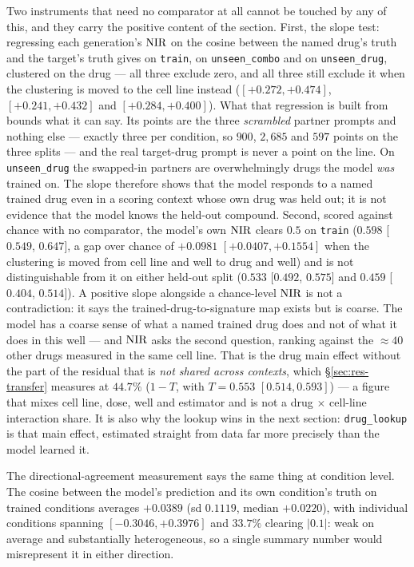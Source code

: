 Two instruments that need no comparator at all cannot be touched by any of this, and they carry the
positive content of the section. First, the slope test: regressing each generation's $\textrm{NIR}$ on the
cosine between the named drug's truth and the target's truth gives  on
\texttt{train},  on \texttt{unseen\_combo} and
 on \texttt{unseen\_drug}, clustered on the drug --- all three exclude
zero, and all three still exclude it when the clustering is moved to the cell line instead
($[+0.272, +0.474]$, $[+0.241, +0.432]$ and $[+0.284, +0.400]$). What that
regression is built from bounds what it can say. Its points are the three \emph{scrambled} partner
prompts and nothing else --- exactly three per condition, so $900$, $2{,}685$ and $597$ points on
the three splits --- and the real target-drug prompt is never a point on the line. On
\texttt{unseen\_drug} the swapped-in partners are overwhelmingly drugs the model \emph{was} trained
on. The slope therefore shows that the model responds to a named trained drug even in a scoring
context whose own drug was held out; it is not evidence that the model knows the held-out compound. Second, scored against chance with no
comparator, the model's own $\textrm{NIR}$ clears $0.5$ on \texttt{train} ($0.598$ [$0.549$, $0.647$], a gap
over chance of $+0.0981$ \nolinebreak[3]$[+0.0407, +0.1554]$ when the clustering is moved from cell
line and well to drug and well) and
is not distinguishable from it on either held-out split ($0.533$ [$0.492$, $0.575$] and $0.459$
[$0.404$, $0.514$]). A positive slope alongside a chance-level $\textrm{NIR}$ is not a contradiction: it
says the trained-drug-to-signature map exists but is coarse. The model has a coarse sense of what a
named trained drug does and not of what it does in this well --- and $\textrm{NIR}$ asks the second
question, ranking against the $\approx 40$ other drugs measured in the same cell line. That is the
drug main effect without the part of the residual that is \emph{not shared across contexts}, which
\S\ref{sec:res-transfer} measures at $44.7\%$ ($1 - T$, with $T = 0.553$
\nolinebreak[3]$[0.514, 0.593]$) --- a figure that mixes cell line, dose, well and estimator and is
not a drug $\times$ cell-line interaction share. It is also why the lookup wins in the next section:
\texttt{drug\_lookup} is that main effect, estimated straight from data far more precisely than the
model learned it.

The directional-agreement measurement says the same thing at condition level. The cosine between the
model's prediction and its own condition's truth on trained conditions averages $+0.0389$ (sd
$0.1119$, median $+0.0220$), with individual conditions spanning $[-0.3046, +0.3976]$ and $33.7\%$
clearing $|0.1|$: weak on average and substantially heterogeneous, so a single summary number would
misrepresent it in either direction.


